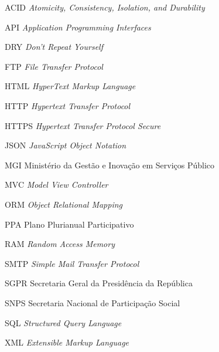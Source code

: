 \begin{siglas}
    \item[ACID] \textit{Atomicity, Consistency, Isolation, and Durability}
    \item[API] \textit{Application Programming Interfaces}
    \item[DRY] \textit{Don't Repeat Yourself}
    \item[FTP] \textit{File Transfer Protocol}
    \item[HTML] \textit{HyperText Markup Language}
    \item[HTTP] \textit{Hypertext Transfer Protocol}
    \item[HTTPS] \textit{Hypertext Transfer Protocol Secure}
    \item[JSON] \textit{JavaScript Object Notation}
    \item[MGI] Ministério da Gestão e Inovação em Serviços Público
    \item[MVC] \textit{Model View Controller}
    \item[ORM] \textit{Object Relational Mapping}
    \item[PPA] Plano Plurianual Participativo
    \item[RAM] \textit{Random Access Memory}
    \item[SMTP] \textit{Simple Mail Transfer Protocol}
    \item[SGPR] Secretaria Geral da Presidência da República
    \item[SNPS] Secretaria Nacional de Participação Social
    \item[SQL] \textit{Structured Query Language}
    \item[XML] \textit{Extensible Markup Language}
\end{siglas}

